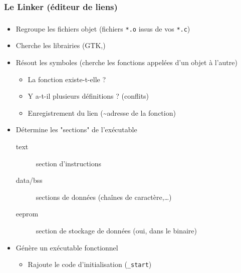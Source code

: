 \subsubsection{Le Linker (éditeur de liens)}
\begin{frame}
\frametitle{\insertsubsubsection}

\begin{itemize}
  \item Regroupe les fichiers objet (fichiers \texttt{*.o} issus de vos \texttt{*.c})
  \item Cherche les librairies (GTK,\…)
  \item Résout les symboles (cherche les fonctions appelées d'un objet à l'autre)
    \begin{itemize}
      \item La fonction existe-t-elle ?
      \item Y a-t-il plusieurs définitions ? (conflits)
      \item Enregistrement du lien (\textasciitilde adresse de la fonction)
    \end{itemize}
  \item Détermine les "sections" de l'exécutable
    \begin{description}
      \item[text] section d'instructions
      \item[data/bss] sections de données (chaînes de caractère,…)
      \item[eeprom] section de stockage de données (oui, dans le binaire\…)
    \end{description}
  \item Génère un exécutable fonctionnel
    \begin{itemize}
      \item Rajoute le code d'initialisation (\texttt{\_start})
    \end{itemize}
\end{itemize}

\end{frame}
